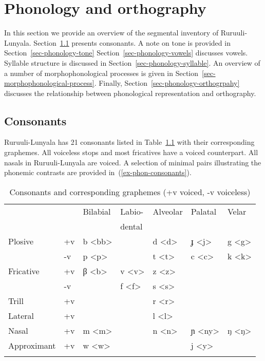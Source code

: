 \chapter{Phonology and orthography}\label{sec-phonology}

In this section we provide an overview of the segmental inventory of Ru\-ruu\-li\hyp{}Lu\-nya\-la. 
Section~\ref{sec-phonology-consonants} presents consonants. 
A note on tone is provided in Section~\ref{sec-phonology-tone} Section~\ref{sec-phonology-vowels} discusses vowels. 
Syllable structure is discussed in Section~\ref{sec-phonology-syllable}. 
An over\-view of a number of morphophonological processes is given in Section~\ref{sec-morphophonological-process}. 
Finally, Section~\ref{sec-phonology-orthogrpahy} discusses the relationship between phonological representation and orthography.


\section{Consonants}\label{sec-phonology-consonants}

Ruruuli-Lunyala has 21 consonants listed in Table~\ref{tab-consonants} with their corresponding graphemes. 
All voiceless stops and most fricatives have a voiced counterpart. 
All nasals in Ru\-ruu\-li\hyp{}Lu\-nya\-la are voiced. 
A selection of minimal pairs illustrating the phonemic contrasts are provided in~(\ref{ex-phon-consonants}).

\begin{table}
\caption{Consonants and corresponding graphemes (+v voiced, -v voiceless)}
\begin{tabularx}{\textwidth}{l X l X X X l}
\lsptoprule
 &  & Bilabial  & Labio-  & Alveolar  & Palatal  & Velar  \\
  &  &   & dental  &   &   &   \\
\midrule
Plosive  & +v & b <bb> &  & d <d>  & ɟ <j> & g <g> \\
 & -v & p <p> &  & t  <t> & c  <c> & k <k>\\
Fricative  & +v &  β  <b> & v  <v> & z  <z>&  &  \\
 & -v &  & f  <f> & s  <s>&  &  \\
Trill & +v &  &  & r  <r>&  &  \\
Lateral  & +v &  &  & l  <l>&  &  \\
Nasal & +v & m <m>&  & n  <n>& ɲ   <ny>& ŋ  <ŋ>\\
Approximant & +v & w <w>&  &  & j <y> &  \\
\lspbottomrule
\end{tabularx}
\label{tab-consonants}
\end{table}

